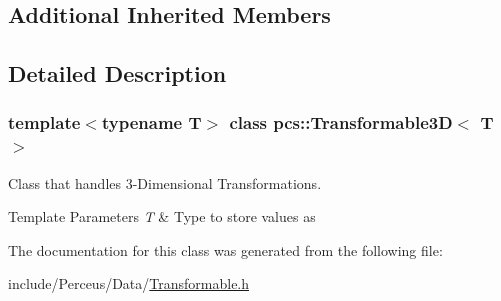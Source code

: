 \subsection*{Additional Inherited Members}


\subsection{Detailed Description}
\subsubsection*{template$<$typename T$>$\newline
class pcs\+::\+Transformable3\+D$<$ T $>$}

Class that handles 3-\/\+Dimensional Transformations. 


\begin{DoxyTemplParams}{Template Parameters}
{\em T} & Type to store values as \\
\hline
\end{DoxyTemplParams}


The documentation for this class was generated from the following file\+:\begin{DoxyCompactItemize}
\item 
include/\+Perceus/\+Data/\hyperlink{Transformable_8h}{Transformable.\+h}\end{DoxyCompactItemize}
